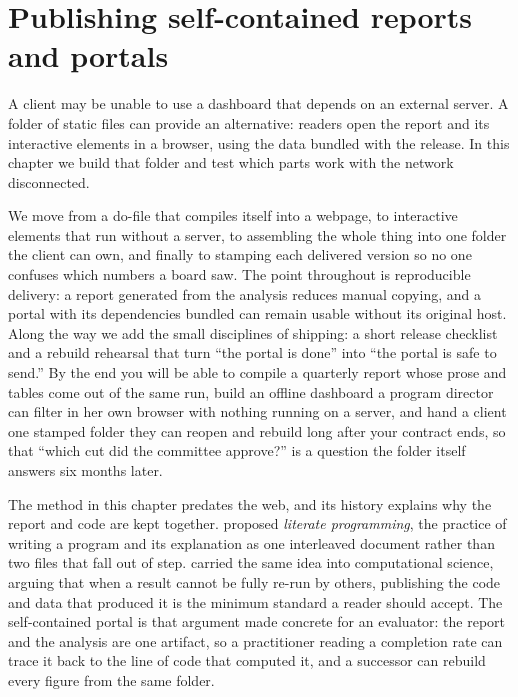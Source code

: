 \chapter{Publishing self-contained reports and portals}\label{ch:portals}

A client may be unable to use a dashboard that depends on an external server. A folder of static files can provide an alternative: readers open the report and its interactive elements in a browser, using the data bundled with the release. In this chapter we build that folder and test which parts work with the network disconnected.

We move from a do-file that compiles itself into a webpage, to interactive elements that run without a server, to assembling the whole thing into one folder the client can own, and finally to stamping each delivered version so no one confuses which numbers a board saw. The point throughout is reproducible delivery: a report generated from the analysis reduces manual copying, and a portal with its dependencies bundled can remain usable without its original host. Along the way we add the small disciplines of shipping: a short release checklist and a rebuild rehearsal that turn \enquote{the portal is done} into \enquote{the portal is safe to send.} By the end you will be able to compile a quarterly report whose prose and tables come out of the same run, build an offline dashboard a program director can filter in her own browser with nothing running on a server, and hand a client one stamped folder they can reopen and rebuild long after your contract ends, so that \enquote{which cut did the committee approve?} is a question the folder itself answers six months later.

The method in this chapter predates the web, and its history explains why the report and code are kept together. \textcite{knuth1984literate} proposed \emph{literate programming}, the practice of writing a program and its explanation as one interleaved document rather than two files that fall out of step. \textcite{peng2011reproducible} carried the same idea into computational science, arguing that when a result cannot be fully re-run by others, publishing the code and data that produced it is the minimum standard a reader should accept. The self-contained portal is that argument made concrete for an evaluator: the report and the analysis are one artifact, so a practitioner reading a completion rate can trace it back to the line of code that computed it, and a successor can rebuild every figure from the same folder.

